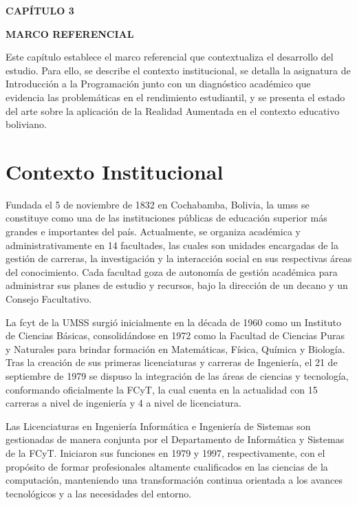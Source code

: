 \setcounter{chapter}{3}
\setcounter{section}{0} 
{\centering
{\large\bfseries CAPÍTULO 3}\par\vspace{0.3cm}
{\Large\bfseries MARCO REFERENCIAL}\par}
\vspace{1cm}

Este capítulo establece el marco referencial que contextualiza el desarrollo 
del estudio. Para ello, se describe el contexto institucional, se detalla la 
asignatura de Introducción a la Programación junto con un diagnóstico académico 
que evidencia las problemáticas en el rendimiento estudiantil, y se presenta 
el estado del arte sobre la aplicación de la Realidad Aumentada en el contexto 
educativo boliviano.

\section{Contexto Institucional}
Fundada el 5 de noviembre de 1832 en Cochabamba, Bolivia, la \ac{umss} se 
constituye como una de las instituciones públicas de educación superior más 
grandes e importantes del país. Actualmente, se organiza académica y 
administrativamente en 14 facultades, las cuales son unidades encargadas de la 
gestión de carreras, la investigación y la interacción social en sus respectivas 
áreas del conocimiento. Cada facultad goza de autonomía de gestión académica 
para administrar sus planes de estudio y recursos, bajo la dirección de un 
decano y un Consejo Facultativo. \parencite{umss2026}\vspace{1.15em}

La \ac{fcyt} de la UMSS surgió inicialmente en la década de 1960 como un 
Instituto de Ciencias Básicas, consolidándose en 1972 como la Facultad de 
Ciencias Puras y Naturales para brindar formación en Matemáticas, Física, 
Química y Biología. Tras la creación de sus primeras licenciaturas y carreras de 
Ingeniería, el 21 de septiembre de 1979 se dispuso la integración de las áreas 
de ciencias y tecnología, conformando oficialmente la FCyT, la cual cuenta en 
la actualidad con 15 carreras a nivel de ingeniería y 4 a nivel de licenciatura.
\parencite{fcyt2026}\vspace{1.15em}

Las Licenciaturas en Ingeniería Informática e Ingeniería de Sistemas son 
gestionadas de manera conjunta por el Departamento de Informática y Sistemas de 
la FCyT. Iniciaron sus funciones en 1979 y 1997, respectivamente, con el 
propósito de formar profesionales altamente cualificados en las ciencias de la 
computación, manteniendo una transformación continua orientada a los avances 
tecnológicos y a las necesidades del entorno. \parencite{cs2026}

